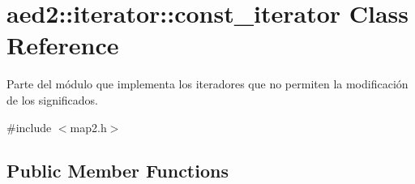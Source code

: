 \hypertarget{classaed2_1_1iterator_1_1const__iterator}{\section{aed2\-:\-:iterator\-:\-:const\-\_\-iterator \-Class \-Reference}
\label{classaed2_1_1iterator_1_1const__iterator}
}


\-Parte del módulo que implementa los iteradores que no permiten la modificación de los significados.  




{\ttfamily \#include $<$map2.\-h$>$}

\subsection*{\-Public \-Member \-Functions}
